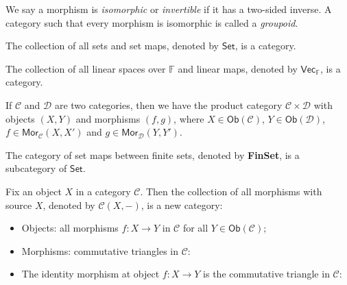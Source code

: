 \documentclass[
	11pt, %
	fleqn, %
	a4paper, %
]{LegrandOrangeBook}
\newcommand{\F}{\mathbb{F}} %
\newcommand{\C}{\mathcal{C}} %
\newcommand{\D}{\mathcal{D}} %
\newcommand{\Set}{\boldsymbol{\mathsf{Set}}} %
\newcommand{\Vect}{\boldsymbol{\mathsf{Vec}}} %
\newcommand{\Mor}{\mathsf{Mor}} %
\newcommand{\Ob}[1]{\mathsf{Ob}(#1)} %
\begin{document}
We say a morphism is \emph{isomorphic} or \emph{invertible} if it has a two-sided inverse. A category such that every morphism is isomorphic is called a \emph{groupoid}.

\begin{example}
    The collection of all sets and set maps, denoted by $\Set$, is a category.
\end{example}

\begin{example}
    The collection of all linear spaces over $\F$ and linear maps, denoted by $\Vect_{\F}$, is a category.
\end{example}

\begin{example}
    If $\C$ and $\D$ are two categories, then we have the product category $\C \times \D$ with objects $(X, Y)$ and morphisms $(f, g)$, where $X \in \Ob{\C}$, $Y \in \Ob{\D}$, $f \in \Mor_{\C}(X, X')$ and $g \in \Mor_{\D}(Y, Y')$.
\end{example}

\begin{example}
    The category of set maps between finite sets, denoted by \textbf{FinSet}, is a subcategory of $\Set$.
\end{example}

\begin{example}
    Fix an object $X$ in a category $\C$. Then the collection of all morphisms with source $X$, denoted by $\C(X, -)$, is a new category:
    \begin{itemize}
        \item Objects: all morphisms $f : X \to Y$ in $\C$ for all $Y \in \Ob{\C}$;
        \item Morphisms: commutative triangles in $\C$:
        \begin{center}
        \end{center}
        \item The identity morphism at object $f : X \to Y$ is the commutative triangle in $\C$:
        \begin{center}
        \end{center}
    \end{itemize} 
\end{example}
\end{document}
